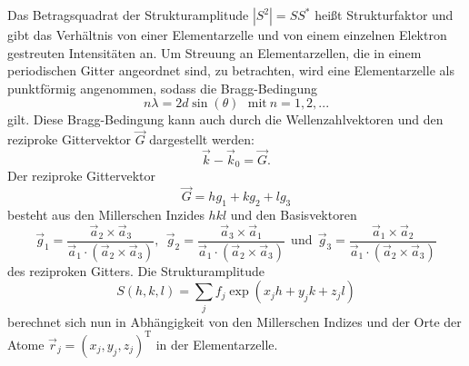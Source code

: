 Das Betragsquadrat der Strukturamplitude  $|S^2|=SS^*$ heißt Strukturfaktor und gibt das Verhältnis von einer Elementarzelle und von einem einzelnen Elektron gestreuten Intensitäten an.
Um Streuung an Elementarzellen, die in einem periodischen Gitter angeordnet sind, zu betrachten, wird eine Elementarzelle als punktförmig angenommen, sodass die Bragg-Bedingung
\begin{equation}
  n\lambda=2d\sin\left(\theta\right)~~~\text{mit}~n=1,2,...
\end{equation}
gilt.
Diese Bragg-Bedingung kann auch durch die Wellenzahlvektoren und den reziproke Gittervektor $\vec G$ dargestellt werden:
\begin{equation}
  \vec k -\vec k_0 =\vec G.
\end{equation}
Der reziproke Gittervektor
\begin{equation}
  \vec G= h g_1+kg_2+lg_3
\end{equation}
besteht aus den Millerschen Inzides $hkl$ und den Basisvektoren
\begin{equation}
   \vec g_1=\frac{\vec a_2\times \vec a_3}{\vec a_1 \cdot \left(\vec a_2 \times \vec a_3\right)}, ~~  \vec g_2=\frac{\vec a_3\times \vec a_1}{\vec a_1 \cdot \left(\vec a_2 \times \vec a_3\right)}~~\text{und}~~  \vec g_3=\frac{\vec a_1\times \vec a_2}{\vec a_1 \cdot \left(\vec a_2 \times \vec a_3\right)}
\end{equation}
des reziproken Gitters.
Die Strukturamplitude
\begin{equation}
  S(h,k,l)=\sum _j f_j\exp\left(x_j h+ y_jk+z_j l\right)
\end{equation}
berechnet sich nun in Abhängigkeit von den Millerschen Indizes und der Orte der Atome $\vec r_j=\left(x_j, y_j, z_j\right)^\text{T}$  in der Elementarzelle.
